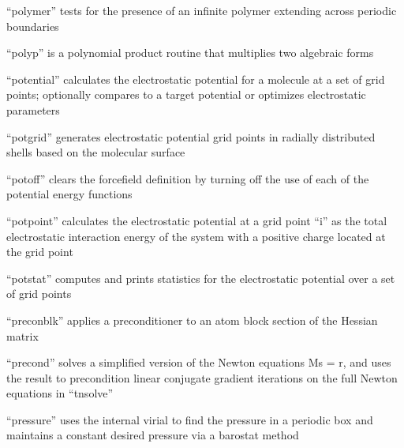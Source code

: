 \documentclass[letterpaper,11pt,english]{sphinxmanual}
\begin{document}

“polymer” tests for the presence of an infinite polymer
extending across periodic boundaries


“polyp” is a polynomial product routine that multiplies two
algebraic forms


“potential” calculates the electrostatic potential for a
molecule at a set of grid points; optionally compares to a
target potential or optimizes electrostatic parameters


“potgrid” generates electrostatic potential grid points in
radially distributed shells based on the molecular surface



“potoff” clears the forcefield definition by turning off
the use of each of the potential energy functions


“potpoint” calculates the electrostatic potential at a grid
point “i” as the total electrostatic interaction energy of
the system with a positive charge located at the grid point


“potstat” computes and prints statistics for the electrostatic
potential over a set of grid points



“preconblk” applies a preconditioner to an atom block section
of the Hessian matrix


“precond” solves a simplified version of the Newton equations
Ms = r, and uses the result to precondition linear conjugate
gradient iterations on the full Newton equations in “tnsolve”


“pressure” uses the internal virial to find the pressure
in a periodic box and maintains a constant desired pressure
via a barostat method
\end{document}

